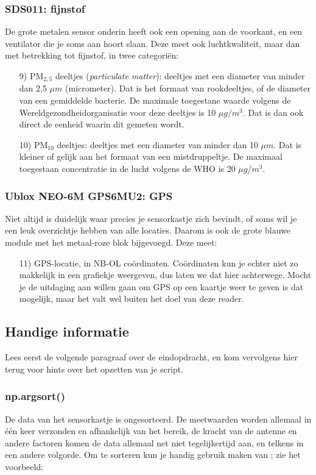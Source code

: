 \documentclass[a4paper,11pt, fleqn]{article}
\begin{document}
\subsubsection{SDS011: fijnstof}
De grote metalen sensor onderin heeft ook een opening aan de voorkant, en een ventilator die je soms aan hoort slaan. Deze meet ook luchtkwaliteit, maar dan met betrekking tot fijnstof, in twee categori\"en:
\begin{itemize}
	\item[9)] PM$_{2,5}$ deeltjes ({\it particulate matter}): deeltjes met een diameter van minder dan 2,5 $\mu m$ (micrometer). Dat is het formaat van rookdeeltjes, of de diameter van een gemiddelde bacterie. De maximale toegestane waarde volgens de Wereldgezondheidorganisatie voor deze deeltjes is 10 $\mu g/m^3$. Dat is dan ook direct de eenheid waarin dit gemeten wordt.
	\item[10)] PM$_{10}$ deeltjes: deeltjes met een diameter van minder dan 10 $\mu m$. Dat is kleiner of gelijk aan het formaat van een mistdruppeltje. De maximaal toegestaan concentratie in de lucht volgens de WHO is 20 $\mu g/m^3$. 
\end{itemize}

\subsubsection{Ublox NEO-6M GPS6MU2: GPS}
Niet altijd is duidelijk waar precies je sensorkastje zich bevindt, of soms wil je een leuk overzichtje hebben van alle locaties. Daarom is ook de grote blauwe module met het metaal-roze blok bijgevoegd. Deze meet:
\begin{itemize}
	\item[11)] GPS-locatie, in NB-OL co\"ordinaten. Co\"ordinaten kun je echter niet zo makkelijk in een grafiekje weergeven, dus laten we dat hier achterwege. Mocht je de uitdaging aan willen gaan om GPS op een kaartje weer te geven is dat mogelijk, maar het valt wel buiten het doel van deze reader.
\end{itemize}

\subsection{Handige informatie}
Lees eerst de volgende paragraaf over de eindopdracht, en kom vervolgens hier terug voor hints over het opzetten van je script.

\subsubsection*{np.argsort()}
De data van het sensorkastje is ongesorteerd. De meetwaarden worden allemaal in \'e\'en keer verzonden en afhankelijk van het bereik, de kracht van de antenne en andere factoren komen de data allemaal net niet tegelijkertijd aan, en telkens in een andere volgorde. Om te sorteren kun je handig gebruik maken van ; zie het voorbeeld:
\end{document}
